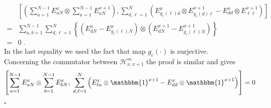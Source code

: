 \documentclass[10pt]{article}
\numberwithin{equation}{section}
\numberwithin{equation}{subsection}
\newcommand{\dt}{\;.}
\begin{document}
\begin{align*}
	&\left[\left(\sum_{a=1}^{N-1}E_{aN}^{x}\otimes\sum_{a=1}^{N-1}E_{aN}^{x+1}\right), \sum_{d,\ell=1}^{N}\left(E_{g_{c}(\ell)d}^{x}\otimes E_{g_{c}(d)\ell}^{x+1} -E_{dd}^{x}\otimes E_{\ell\ell}^{x+1}\right)\right]
	\\=&
	\sum_{a,b=1}^{N-1}\sum_{d,\ell=1}^{N}\left\{\left(E_{dN}^{x}-E_{g_{c}(\ell)N}^{x}\right)\otimes \left(E_{dN}^{x+1}-E_{g_{c}(\ell)N}^{x+1}\right)\right\}
	\\=&0\dt
\end{align*}
In the last equality we used the fact that map $g_{c}(\cdot)$ is surjective. \\
Concerning the commutator between $\mathcal{H}_{x,x+1}^{m}$ the proof is similar and gives
\begin{equation}
	\left[\sum_{a=1}^{N-1}E_{aN}^{x}\otimes \sum_{b=1}^{N-1}E_{bN}^{x},\;\sum_{d,\ell=1}^{N}\left(E_{\ell a}^{x}\otimes \mathbbm{1}^{x+1}-E_{dd}^{x}\otimes \mathbbm{1}^{x+1}\right)\right]=0
\end{equation}
\begin{flushright}
	$\square$
\end{flushright}
\end{document}
